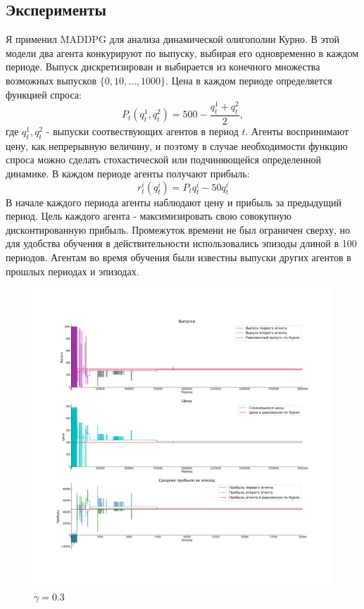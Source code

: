 \documentclass[12pt, a4paper]{extarticle}
\theoremstyle{definition}
\begin{document}
\subsection{Эксперименты}
Я применил MADDPG для анализа динамической олигополии Курно. В этой модели два агента конкурируют по выпуску, выбирая его одновременно в каждом периоде. Выпуск дискретизирован и выбирается из конечного множества возможных выпусков $\{0,10,\ldots,1000\}$. Цена в каждом периоде определяется функцией спроса:
\begin{equation}
    P_t(q^1_t,q^2_t) = 500 - \frac{q^1_t + q^2_t}{2},
\end{equation}
где $q^1_t,q^2_t$ - выпуски соотвествующих агентов в период $t$. Агенты воспринимают цену, как непрерывную величину, и поэтому в случае необходимости функцию спроса можно сделать стохастической или подчиняющейся определенной динамике. В каждом периоде агенты получают прибыль:
\begin{equation}
    r^i_t(q^i_t) = P_t q^i_t - 50q^i_t 
\end{equation}
В начале каждого периода агенты наблюдают цену и прибыль за предыдущий период. Цель каждого агента - максимизировать свою совокупную дисконтированную прибыль. Промежуток времени не был ограничен сверху, но для удобства обучения в действительности использовались эпизоды длиной в 100 периодов.
Агентам во время обучения были известны выпуски других агентов в прошлых периодах и эпизодах. 
\newpage
\begin{figure}[h]
    \centering
    \includegraphics[width=\textwidth,height=\textheight,keepaspectratio]{gamma3.png}
    \caption{$\gamma = 0.3$}
    \label{fig:gamma3}
\end{figure}
\end{document}
